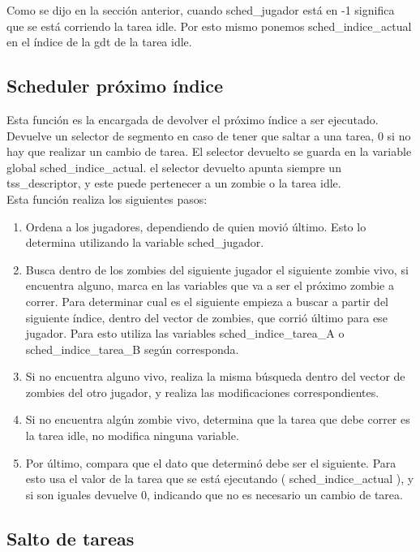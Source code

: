 \documentclass[a4paper]{article}
\begin{document}
Como se dijo en la sección anterior, cuando sched\_jugador está en -1 significa que se está corriendo la tarea idle. Por esto mismo ponemos sched\_indice\_actual en el índice de la gdt de la tarea idle.

\subsection{Scheduler próximo índice}

Esta función es la encargada de devolver el próximo índice a ser ejecutado. Devuelve un selector de segmento en caso de tener que saltar a una tarea, 0 si no hay que realizar un cambio de tarea. El selector devuelto se guarda en la variable global sched\_indice\_actual. el selector devuelto apunta siempre un tss\_descriptor, y este puede pertenecer a un zombie o la tarea idle.\\

Esta función realiza los siguientes pasos:
\begin{enumerate}
\item Ordena a los jugadores, dependiendo de quien movió último. Esto lo determina utilizando la variable sched\_jugador.
\item Busca dentro de los zombies del siguiente jugador el siguiente zombie vivo, si encuentra alguno, marca en las variables que va a ser el próximo zombie a correr. Para determinar cual es el siguiente empieza a buscar a partir del siguiente índice, dentro del vector de zombies, que corrió último para ese jugador. Para esto utiliza las variables sched\_indice\_tarea\_A o sched\_indice\_tarea\_B según corresponda.
\item Si no encuentra alguno vivo, realiza la misma búsqueda dentro del vector de zombies del otro jugador, y realiza las modificaciones correspondientes. 
\item Si no encuentra algún zombie vivo, determina que la tarea que debe correr es la tarea idle, no modifica ninguna variable.
\item Por último, compara que el dato que determinó debe ser el siguiente. Para esto usa el valor de la tarea que se está ejecutando ( sched\_indice\_actual ), y si son iguales devuelve 0, indicando que no es necesario un cambio de tarea. 
\end{enumerate}

\subsection{Salto de tareas}
\end{document}
